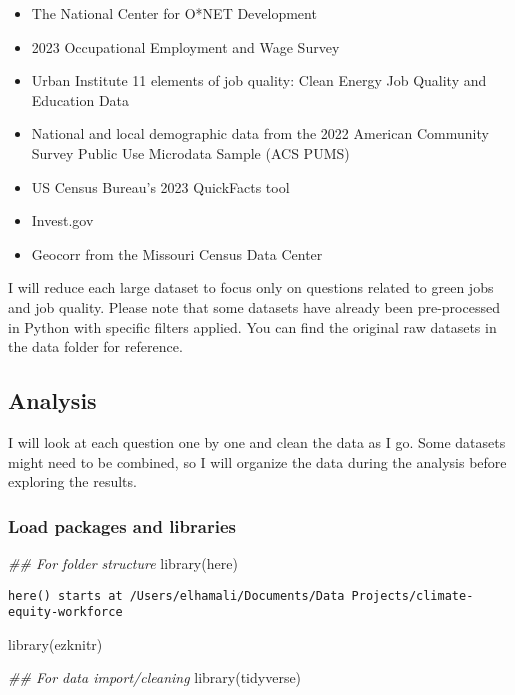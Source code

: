 \documentclass[
  letterpaper,
  DIV=11,
  numbers=noendperiod]{scrartcl}
\newenvironment{Shaded}{\begin{snugshade}}{\end{snugshade}}
\newcommand{\DocumentationTok}[1]{\textcolor[rgb]{0.37,0.37,0.37}{\textit{#1}}}
\newcommand{\FunctionTok}[1]{\textcolor[rgb]{0.28,0.35,0.67}{#1}}
\newcommand{\NormalTok}[1]{\textcolor[rgb]{0.00,0.23,0.31}{#1}}
\providecommand{\tightlist}{%
  \setlength{\itemsep}{0pt}\setlength{\parskip}{0pt}}\usepackage{longtable,booktabs,array}
\begin{document}
\begin{itemize}
\tightlist
\item
  The National Center for O*NET Development
\item
  2023 Occupational Employment and Wage Survey
\item
  Urban Institute 11 elements of job quality: Clean Energy Job Quality
  and Education Data
\item
  National and local demographic data from the 2022 American Community
  Survey Public Use Microdata Sample (ACS PUMS)
\item
  US Census Bureau's 2023 QuickFacts tool
\item
  Invest.gov
\item
  Geocorr from the Missouri Census Data Center
\end{itemize}

I will reduce each large dataset to focus only on questions related to
green jobs and job quality. Please note that some datasets have already
been pre-processed in Python with specific filters applied. You can find
the original raw datasets in the data folder for reference.

\subsection{Analysis}\label{analysis}

I will look at each question one by one and clean the data as I go. Some
datasets might need to be combined, so I will organize the data during
the analysis before exploring the results.

\subsubsection{Load packages and
libraries}\label{load-packages-and-libraries}

\begin{Shaded}
\begin{Highlighting}[]
\DocumentationTok{\#\# For folder structure}
\FunctionTok{library}\NormalTok{(here)}
\end{Highlighting}
\end{Shaded}

\begin{verbatim}
here() starts at /Users/elhamali/Documents/Data Projects/climate-equity-workforce
\end{verbatim}

\begin{Shaded}
\begin{Highlighting}[]
\FunctionTok{library}\NormalTok{(ezknitr)}

\DocumentationTok{\#\# For data import/cleaning}
\FunctionTok{library}\NormalTok{(tidyverse)}
\end{Highlighting}
\end{Shaded}
\end{document}
